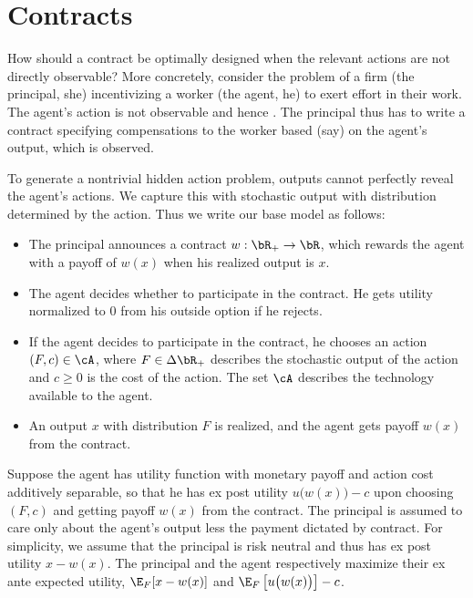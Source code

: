\chapter{Contracts}

How should a contract be optimally designed when the relevant actions are not directly observable?
More concretely, consider the problem of a firm (the principal, she) incentivizing a worker (the agent, he) to exert effort in their work.
The agent's action is not observable and hence .
The principal thus has to write a contract specifying compensations to the worker based (say) on the agent's output, which is observed.

To generate a nontrivial hidden action problem, outputs cannot perfectly reveal the agent's actions.
We capture this with stochastic output with distribution determined by the action.
Thus we write our base model as follows:
\begin{itemize}
  \item The principal announces a contract \(w: \bR_+ \to \bR\), which rewards the agent with a payoff of \(w(x)\) when his realized output is \(x\).
  \item The agent decides whether to participate in the contract.
    He gets utility normalized to \(0\) from his outside option if he rejects.
  \item If the agent decides to participate in the contract, he chooses an action \((F, c) \in \cA\), where \(F \in \Delta \bR_+\) describes the stochastic output of the action and \(c \geq 0\) is the cost of the action.
    The set \(\cA\) describes the technology available to the agent.
  \item An output \(x\) with distribution \(F\) is realized, and the agent gets payoff \(w(x)\) from the contract.
\end{itemize}

Suppose the agent has utility function with monetary payoff and action cost additively separable, so that he has ex post utility \(u\big(w(x)\big) - c\) upon choosing \((F, c)\) and getting payoff \(w(x)\) from the contract.
The principal is assumed to care only about the agent's output less the payment dictated by contract.
For simplicity, we assume that the principal is risk neutral and thus has ex post utility \(x - w(x)\).
The principal and the agent respectively maximize their ex ante expected utility, \(\E_F[x - w(x)]\) and \(\E_F\left[ u\big(w(x)\big) \right] - c\).

